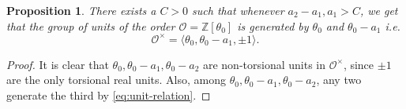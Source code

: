 \documentclass[11pt,letterpaper]{amsart}
\newtheorem{prop}[theorem]{Proposition}
\theoremstyle{definition}
\theoremstyle{remark}
\newcommand{\cal}[1]{\mathcal{#1}}
\newcommand{\bb}[1]{\mathbb{#1}}
\newcommand{\Z}{\bb Z}
\newcommand{\calO}{\cal O}
\begin{document}
	
	\begin{prop}\label{pr:proposition_polynom-units-orders}
		There exists a $C>0$ such that whenever $a_2-a_1, a_1 > C$, we get that the
		group of units of the order $\mathcal{O} = \Z[\theta_0]$ is generated by $\theta_0$ and $\theta_0-a_1$ i.e. 
		$$\mathcal{O}^\times = \langle \theta_0, \theta_0 - a_1,  \pm 1 \rangle.$$ 
	\end{prop}
	
	\begin{proof}
		It is clear that $\theta_0,\theta_0 - a_1,\theta_0 -a_2$ are non-torsional units in $\calO^{\times}$, since $\pm 1$ are the only torsional real units. Also, among $\theta_0,\theta_0-a_1,\theta_0-a_2$, any two generate the third by \cref{eq:unit-relation}. 
		

\end{proof}
\end{document}
